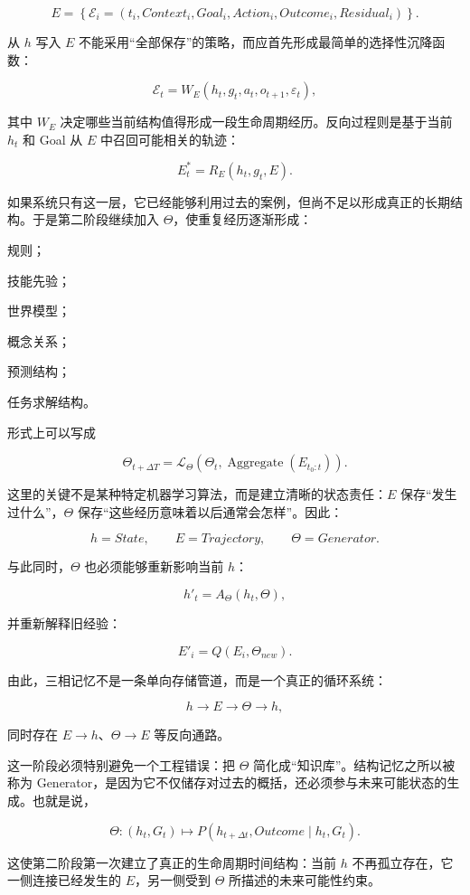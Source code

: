 \[
E
=
\left\{
\mathcal E_i
=
\left(
t_i,
Context_i,
Goal_i,
Action_i,
Outcome_i,
Residual_i
\right)
\right\}.
\]

从 \(h\) 写入 \(E\) 不能采用“全部保存”的策略，而应首先形成最简单的选择性沉降函数：

\[
\mathcal E_{t}
=
W_E
\left(
h_t,
g_t,
a_t,
o_{t+1},
\varepsilon_t
\right),
\]

其中 \(W_E\) 决定哪些当前结构值得形成一段生命周期经历。反向过程则是基于当前 \(h_t\) 和 Goal 从 \(E\) 中召回可能相关的轨迹：

\[
E^\ast_t
=
R_E(h_t,g_t,E).
\]

如果系统只有这一层，它已经能够利用过去的案例，但尚不足以形成真正的长期结构。于是第二阶段继续加入 \(\Theta\)，使重复经历逐渐形成：

规则；

技能先验；

世界模型；

概念关系；

预测结构；

任务求解结构。

形式上可以写成

\[
\Theta_{t+\Delta T}
=
\mathcal L_\Theta
\left(
\Theta_t,
\operatorname{Aggregate}(E_{t_0:t})
\right).
\]

这里的关键不是某种特定机器学习算法，而是建立清晰的状态责任：\(E\) 保存“发生过什么”，\(\Theta\) 保存“这些经历意味着以后通常会怎样”。因此：

\[
h=State,\qquad
E=Trajectory,\qquad
\Theta=Generator.
\]

与此同时，\(\Theta\) 也必须能够重新影响当前 \(h\)：

\[
h'_t
=
A_\Theta(h_t,\Theta),
\]

并重新解释旧经验：

\[
E'_i
=
Q(E_i,\Theta_{new}).
\]

由此，三相记忆不是一条单向存储管道，而是一个真正的循环系统：

\[
h
\rightarrow
E
\rightarrow
\Theta
\rightarrow
h,
\]

同时存在 \(E\rightarrow h\)、\(\Theta\rightarrow E\) 等反向通路。

这一阶段必须特别避免一个工程错误：把 \(\Theta\) 简化成“知识库”。结构记忆之所以被称为 Generator，是因为它不仅储存对过去的概括，还必须参与未来可能状态的生成。也就是说，

\[
\Theta
:
(h_t,G_t)
\mapsto
P(h_{t+\Delta t},Outcome\mid h_t,G_t).
\]

这使第二阶段第一次建立了真正的生命周期时间结构：当前 \(h\) 不再孤立存在，它一侧连接已经发生的 \(E\)，另一侧受到 \(\Theta\) 所描述的未来可能性约束。


